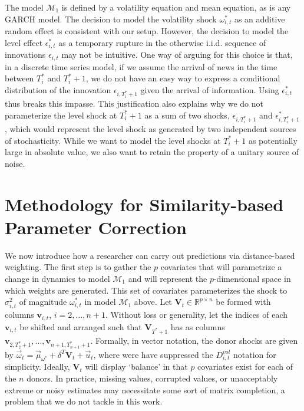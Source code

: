 \documentclass[11pt,3p,review,authoryear]{elsarticle}
\newcommand{\x}{\textbf{v}}
\def\mc#1{\mathcal{#1}} %
\def\mc#1{\mathcal{#1}}
\theoremstyle{definition}
\begin{document}
The model $\mc{M}_1$ is defined by a volatility equation and mean equation, as is any GARCH model.  The decision to model the volatility shock $\omega^{*}_{i,t}$ as an additive random effect is consistent with our setup.  However, the decision to model the level effect $\epsilon^{*}_{i,t}$ as a temporary rupture in the otherwise i.i.d. sequence of innovations $\epsilon_{i,t}$ may not be intuitive.  One way of arguing for this choice is that, in a discrete time series model, if we assume the arrival of news in the time between $T_{i}^{*}$ and $T_{i}^{*}+1$, we do not have an easy way to express a conditional distribution of the innovation $\epsilon_{i,T_{i}^{*}+1}$ given the arrival of information.  Using $\epsilon^{*}_{i,t}$ thus breaks this impasse.  This justification also explains why we do not parameterize the level shock at $T_{i}^{*}+1$ as a sum of two shocks, $\epsilon_{i,T_{i}^{*}+1}$ and $\epsilon^{*}_{i,T_{i}^{*}+1}$, which would represent the level shock as generated by two independent sources of stochasticity. While we want to model the level shocks at $T_{i}^{*}+1$ as potentially large in absolute value, we also want to retain the property of a unitary source of noise.


\section{Methodology for Similarity-based Parameter Correction}

We now introduce how a researcher can carry out predictions via distance-based weighting.  The first step is to gather the $p$ covariates that will parametrize a change in dynamics to model $\mc{M}_1$ and will represent the $p$-dimensional space in which weights are generated.  This set of covariates parameterizes the shock to $\sigma^2_{i,t}$  of magnitude $\omega^*_{i,t}$ in model $\mc{M}_{1}$ above.  Let $\textbf{V}_{t} \in \mathbb{R}^{p \times n}$ be formed with columns $\x_{i,t}$, $i = 2,\ldots,n+1$.  Without loss or generality, let the indices of each $\x_{i,t}$ be shifted and arranged such that $\textbf{V}_{T^{*}+1}$ has as columns $\x_{2,T_{2}^{*}+1},...,\x_{n+1,T_{n+1}^{*}+1}$.  Formally, in vector notation, the donor shocks are given by $\vec{\omega}_t = \vec{\mu}_{\omega^{*}} + \delta^{T}\textbf{V}_{t} + \vec{u}_{t}$, 
    where were have suppressed the $D^{vol}_{i,t}$ notation for simplicity.  %
    Ideally, $\textbf{V}_{t}$ will display `balance' in that $p$ covariates exist for each of the $n$ donors.  In practice, missing values, corrupted values, or unacceptably extreme or noisy estimates may necessitate some sort of matrix completion, a problem that we do not tackle in this work.  
\end{document}
